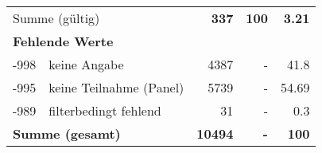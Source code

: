 \begin{longtable}{lXrrr}
     \midrule
     \multicolumn{2}{l}{Summe (gültig)} &
       \textbf{\num{337}} &
     \textbf{100} &
       \textbf{\num[round-mode=places,round-precision=2]{3,21}} \\
     \multicolumn{5}{l}{\textbf{Fehlende Werte}}\\
       -998 &
       keine Angabe &
         \num{4387} &
        - &
         \num[round-mode=places,round-precision=2]{41,8} \\
       -995 &
       keine Teilnahme (Panel) &
         \num{5739} &
        - &
         \num[round-mode=places,round-precision=2]{54,69} \\
       -989 &
       filterbedingt fehlend &
         \num{31} &
        - &
         \num[round-mode=places,round-precision=2]{0,3} \\
     \midrule
     \multicolumn{2}{l}{\textbf{Summe (gesamt)}} &
          \textbf{\num{10494}} &
        \textbf{-} &
        \textbf{100} \\
     \bottomrule
     \end{longtable}
     
